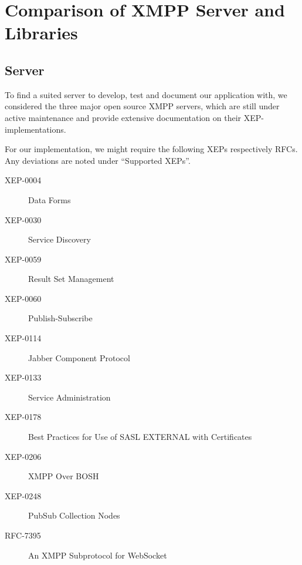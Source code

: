 \section{Comparison of XMPP Server and Libraries}\label{sec:comparison-of-xmpp-server-and-libraries}


\subsection{Server}

To find a suited server to develop, test and document our application with, we considered the three major open source XMPP servers, which are still under active maintenance and provide extensive documentation on their XEP-implementations.

For our implementation, we might require the following XEPs respectively RFCs. Any deviations are noted under ``Supported XEPs''.

\begin{description}
    \item[XEP-0004] Data Forms
    \item[XEP-0030] Service Discovery
    \item[XEP-0059] Result Set Management
    \item[XEP-0060] Publish-Subscribe
    \item[XEP-0114] Jabber Component Protocol
    \item[XEP-0133] Service Administration
    \item[XEP-0178] Best Practices for Use of SASL EXTERNAL with Certificates
    \item[XEP-0206] XMPP Over BOSH
    \item[XEP-0248] PubSub Collection Nodes
    \item[RFC-7395] An XMPP Subprotocol for WebSocket
\end{description}

